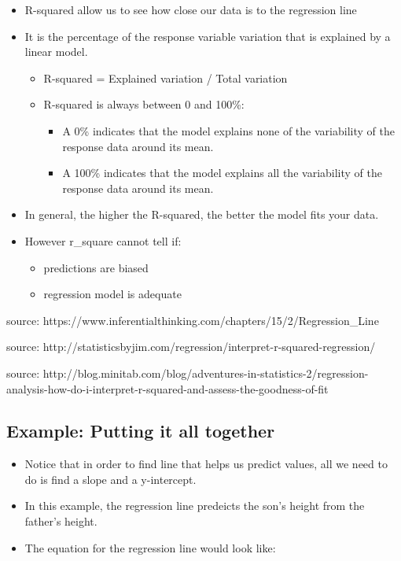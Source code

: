 \documentclass[11pt]{article}
\providecommand{\tightlist}{%
      \setlength{\itemsep}{0pt}\setlength{\parskip}{0pt}}
\begin{document}
\begin{itemize}
\tightlist
\item
  R-squared allow us to see how close our data is to the regression line
\item
  It is the percentage of the response variable variation that is
  explained by a linear model.

  \begin{itemize}
  \tightlist
  \item
    R-squared = Explained variation / Total variation
  \item
    R-squared is always between 0 and 100\%:

    \begin{itemize}
    \tightlist
    \item
      A 0\% indicates that the model explains none of the variability of
      the response data around its mean.
    \item
      A 100\% indicates that the model explains all the variability of
      the response data around its mean.
    \end{itemize}
  \end{itemize}
\item
  In general, the higher the R-squared, the better the model fits your
  data.
\item
  However r\_square cannot tell if:

  \begin{itemize}
  \tightlist
  \item
    predictions are biased
  \item
    regression model is adequate
  \end{itemize}
\end{itemize}

    source:
https://www.inferentialthinking.com/chapters/15/2/Regression\_Line

source:
http://statisticsbyjim.com/regression/interpret-r-squared-regression/

source:
http://blog.minitab.com/blog/adventures-in-statistics-2/regression-analysis-how-do-i-interpret-r-squared-and-assess-the-goodness-of-fit

    \subsection{Example: Putting it all
together}\label{example-putting-it-all-together}

    

    \begin{itemize}
\tightlist
\item
  Notice that in order to find line that helps us predict values, all we
  need to do is find a slope and a y-intercept.
\item
  In this example, the regression line predeicts the son's height from
  the father's height.
\item
  The equation for the regression line would look like:
\end{itemize}
\end{document}
